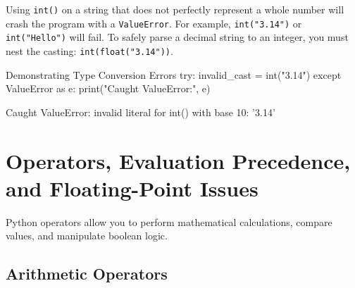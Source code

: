\begin{commonmistake}
Using \texttt{int()} on a string that does not perfectly represent a whole number will crash the program with a \texttt{ValueError}. For example, \texttt{int("3.14")} or \texttt{int("Hello")} will fail. To safely parse a decimal string to an integer, you must nest the casting: \texttt{int(float("3.14"))}.
\end{commonmistake}

\begin{pythoncode}{Demonstrating Type Conversion Errors}
try:
    invalid_cast = int("3.14")
except ValueError as e:
    print("Caught ValueError:", e)
\end{pythoncode}

\begin{outputbox}
Caught ValueError: invalid literal for int() with base 10: '3.14'
\end{outputbox}

\section{Operators, Evaluation Precedence, and Floating-Point Issues}

Python operators allow you to perform mathematical calculations, compare values, and manipulate boolean logic.

\subsection{Arithmetic Operators}

